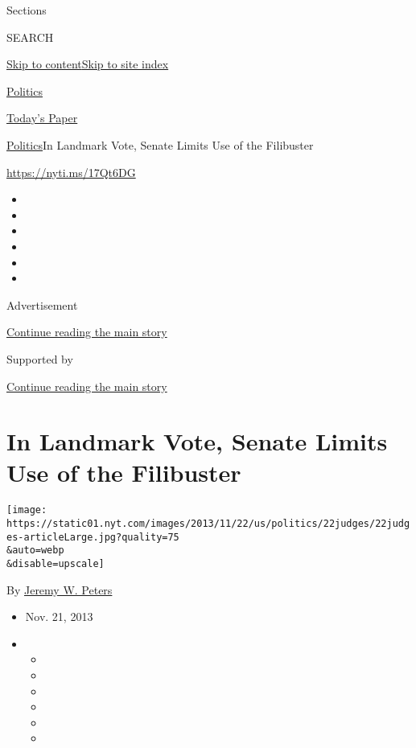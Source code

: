 Sections

SEARCH

\protect\hyperlink{site-content}{Skip to
content}\protect\hyperlink{site-index}{Skip to site index}

\href{https://www.nytimes.com/section/politics}{Politics}

\href{https://myaccount.nytimes.com/auth/login?response_type=cookie\&client_id=vi}{}

\href{https://www.nytimes.com/section/todayspaper}{Today's Paper}

\href{/section/politics}{Politics}\textbar{}In Landmark Vote, Senate
Limits Use of the Filibuster

\url{https://nyti.ms/17Qt6DG}

\begin{itemize}
\item
\item
\item
\item
\item
\item
\end{itemize}

Advertisement

\protect\hyperlink{after-top}{Continue reading the main story}

Supported by

\protect\hyperlink{after-sponsor}{Continue reading the main story}

\hypertarget{in-landmark-vote-senate-limits-use-of-the-filibuster}{%
\section{In Landmark Vote, Senate Limits Use of the
Filibuster}\label{in-landmark-vote-senate-limits-use-of-the-filibuster}}

\texttt{[image: https://static01.nyt.com/images/2013/11/22/us/politics/22judges/22judges-articleLarge.jpg?quality=75\\\&auto=webp\\\&disable=upscale]}

By \href{https://www.nytimes.com/by/jeremy-w-peters}{Jeremy W. Peters}

\begin{itemize}
\item
  Nov. 21, 2013
\item
  \begin{itemize}
  \item
  \item
  \item
  \item
  \item
  \item
  \end{itemize}
\end{itemize}

